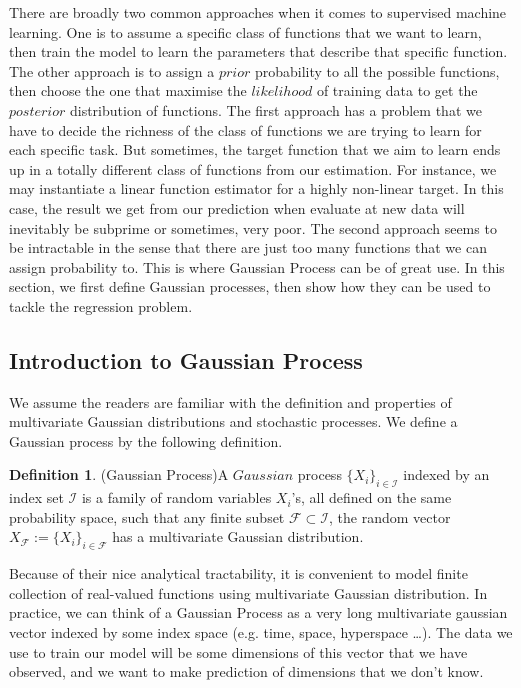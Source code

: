 \documentclass[11pt,a4paper]{article}
\theoremstyle{definition}
\newtheorem{definition}[theorem]{Definition}
\numberwithin{equation}{section}
\begin{document}
	There are broadly two common approaches when it comes to supervised machine learning. One is to assume a specific class of functions that we want to learn, then train the model to learn the parameters that describe that specific function. The other approach is to assign a $prior$ probability to all the possible functions, then choose the one that maximise the $likelihood$ of training data to get the $posterior$ distribution of functions. The first approach has a problem that we have to decide the richness of the class of functions we are trying to learn for each specific task. But sometimes, the target function that we aim to learn ends up in a totally different class of functions from our estimation. For instance, we may instantiate a linear function estimator for a highly non-linear target. In this case, the result we get from our prediction when evaluate at new data will inevitably be subprime or sometimes, very poor. The second approach seems to be intractable in the sense that there are just too many functions that we can assign probability to. This is where Gaussian Process can be of great use. In this section, we first define Gaussian processes, then show how they can be used to tackle the regression problem. 
	
	\subsection{Introduction to Gaussian Process}
	
	We assume the readers are familiar with the definition and properties of multivariate Gaussian distributions and stochastic processes. We define a Gaussian process by the following definition.
	
	\begin{definition}(Gaussian Process)\label{def:gp}
		A $Gaussian$ process $\{X_i\}_{i\in \mathcal{I}}$ indexed by an index set $\mathcal{I}$ is a family of random variables $X_i$'s, all defined on the same probability space, such that any finite subset $\mathcal{F}\subset\mathcal{I}$, the random vector $X_{\mathcal{F}} := \{X_i\}_{i\in \mathcal{F}}$ has a multivariate Gaussian distribution.\cite[Lalley]{Lalley}
	\end{definition}
	
	Because of their nice analytical tractability, it is convenient to model finite collection of real-valued functions using  multivariate Gaussian distribution. In practice, we can think of a Gaussian Process as a very long multivariate gaussian vector indexed by some index space (e.g. time, space, hyperspace \ldots). The data we use to train our model will be some dimensions of this vector that we have observed, and we want to make prediction of dimensions that we don't know. 
	
\end{document}
